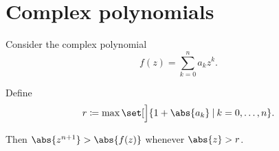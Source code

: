 \section{Complex polynomials}\label{sec:complex_polynomials}

\begin{proposition}\label{thm:topological_ring_polynomials_are_continuous}
\end{proposition}

\begin{proposition}\label{thm:complex_polynomials_dominated_by_power}
  Consider the complex polynomial
  \begin{equation*}
    f(z) = \sum_{k=0}^n a_k z^k.
  \end{equation*}

  Define
  \begin{equation*}
    r \coloneqq \max\set[\Big]{ 1 + \abs{a_k} \given k = 0, \ldots, n }.
  \end{equation*}

  Then \( \abs{z^{n+1}} > \abs{f(z)} \) whenever \( \abs{z} > r \).
\end{proposition}
